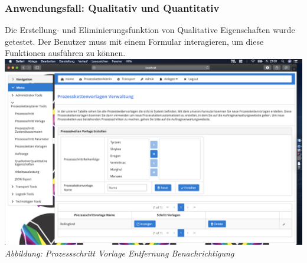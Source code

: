 \documentclass[enabledeprecatedfontcommands,fontsize=12pt,paper=a4,twoside]{scrartcl}
\begin{document}

\subsubsection{Anwendungsfall: Qualitativ und Quantitativ}
Die Erstellung- und Eliminierungsfunktion von Qualitative Eigenschaften wurde getestet. Der Benutzer muss mit einem Formular interagieren, um diese Funktionen ausführen zu können.\\
\hypertarget{sc3.3.3.7}{
\includegraphics[width=1\textwidth]{Screenshots/335Formular.png}
\textit{Abbildung: Prozessschritt Vorlage Entfernung Benachrichtigung}
}
\end{document}
